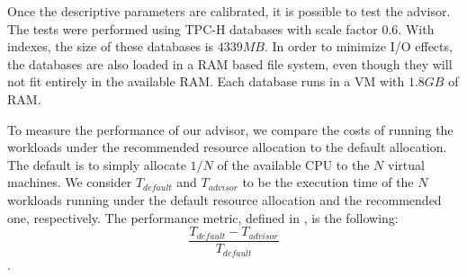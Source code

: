  Once the descriptive parameters are calibrated, it is possible to test the advisor. The tests were performed using TPC-H databases with scale factor 0.6. With indexes, the size of these databases is $4339 MB$. In order to minimize I/O effects, the databases are also loaded  in a RAM based file system, even though they will not fit entirely in the available RAM. Each database runs in a VM with $1.8 GB$ of RAM.
 
 To measure the performance of our advisor, we compare the costs of running the workloads under the recommended resource allocation to the default allocation. The default is to simply allocate $1/N$ of the available CPU to the $N$ virtual machines. We consider $T_{default}$ and $T_{advisor}$ to be the execution time of the $N$ workloads running under the default resource allocation and the recommended one, respectively. The performance metric, defined in \cite{Soror:2008:AVM:1376616.1376711}, is the following:
 \[
  \frac{T_{default}-T_{advisor}}{T_{default}}
 \]
.
